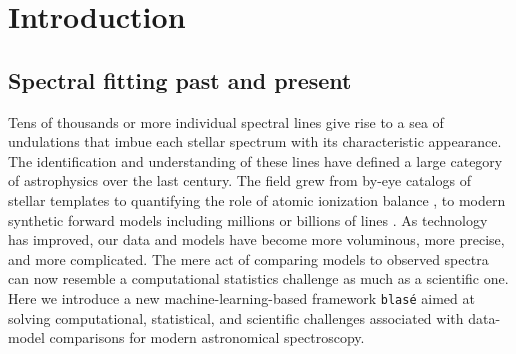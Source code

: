 \documentclass[twocolumn]{aastex631}
\begin{document}

\section{Introduction}\label{sec:intro}

\subsection{Spectral fitting past and present}

Tens of thousands or more individual spectral lines give rise to a sea of undulations that imbue each stellar spectrum with its characteristic appearance.  The identification and understanding of these lines have defined a large category of astrophysics over the last century.  The field grew from by-eye catalogs of stellar templates \citep{1901AnHar..28..129C} to quantifying the role of atomic ionization balance \citep{1925PhDT.........1P}, to modern synthetic forward models including millions or billions of lines \citep[\emph{e.g.}][]{husser13, 2021ApJ...920...85M}.  As technology has improved, our data and models have become more voluminous, more precise, and more complicated.  The mere act of comparing models to observed spectra can now resemble a computational statistics challenge as much as a scientific one.  Here we introduce a new machine-learning-based framework \texttt{blas\'e} aimed at solving computational, statistical, and scientific challenges associated with data-model comparisons for modern astronomical spectroscopy.
\end{document}
